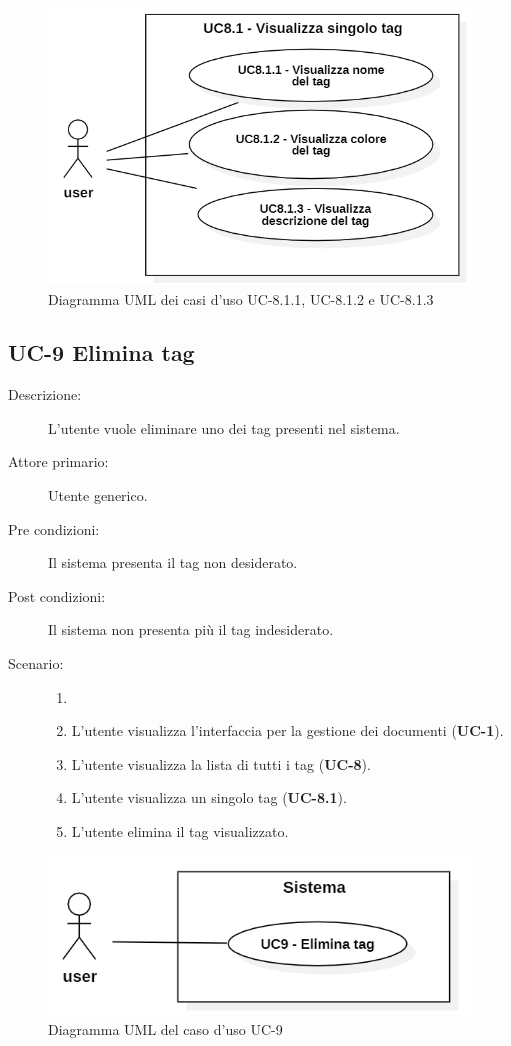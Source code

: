 \begin{figure}[H]
    \centering
    \includegraphics[width=0.8\linewidth]{UC8.1.1-2-3.PNG}
    \caption{Diagramma UML dei casi d'uso UC-8.1.1, UC-8.1.2 e UC-8.1.3}
    \label{fig:UC8.1.1-2-3}
\end{figure}

\subsection{UC-9 Elimina tag}
\begin{description}
    \item[Descrizione:] L'utente vuole eliminare uno dei tag presenti nel sistema.
    \item[Attore primario:] Utente generico.
    \item[Pre condizioni:] Il sistema presenta il tag non desiderato.
    \item[Post condizioni:] Il sistema non presenta più il tag indesiderato.
    \item[Scenario:]
    \begin{enumerate}
        \item[] 
        \item L’utente visualizza l'interfaccia per la gestione dei documenti (\textbf{UC-1}).
        \item L’utente visualizza la lista di tutti i tag (\textbf{UC-8}).
        \item L'utente visualizza un singolo tag (\textbf{UC-8.1}).
        \item L'utente elimina il tag visualizzato.
    \end{enumerate}
\end{description}

\begin{figure}[H]
    \centering
    \includegraphics[width=0.8\linewidth]{UC9.PNG}
    \caption{Diagramma UML del caso d'uso UC-9}
    \label{fig:UC9}
\end{figure}

